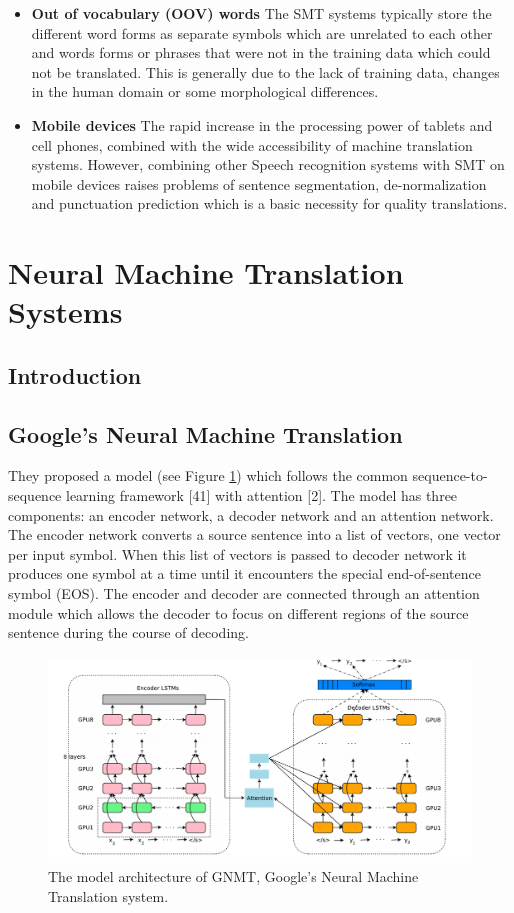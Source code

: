 \begin{itemize}
     \item\textbf{Out of vocabulary (OOV) words}    The SMT systems typically store the different word forms as separate symbols which are unrelated to each other and words forms or phrases that were not in the training data which could not be translated. This is generally due to the lack of training data, changes in the human domain or some morphological differences. 
     \item\textbf{Mobile devices}   The rapid increase in the processing power of tablets and cell phones, combined with the wide accessibility of machine translation systems. However, combining other Speech recognition systems with SMT on mobile devices raises problems of sentence segmentation, de-normalization and punctuation prediction which is a basic necessity for quality translations.
\end{itemize}
\section{Neural Machine Translation Systems}
\subsection{Introduction}
\subsection{Google's Neural Machine Translation}
They proposed a model (see Figure \ref{gnmt1}) which follows the common sequence-to-sequence learning framework [41] with attention [2]. The model has three components: an encoder network, a decoder network and an attention network. The encoder network converts a source sentence into a list of vectors, one vector per input symbol. When this list of vectors is passed to decoder network it produces one symbol at a time until it encounters the special end-of-sentence symbol (EOS). The encoder and decoder are connected through an attention module which allows the decoder to focus on different regions of the source sentence during the course of decoding. 
\begin{figure}[h]
\includegraphics[width=\textwidth]{figures/gnmt1.png}
\caption{ The model architecture of GNMT, Google’s Neural Machine Translation system. } \label{gnmt1}
\end{figure}

